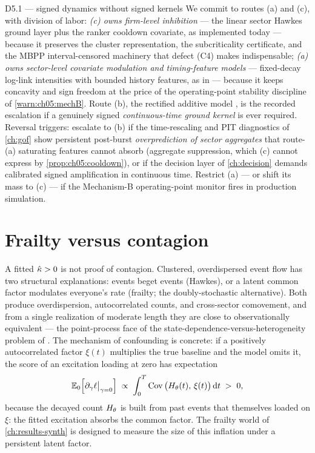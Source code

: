 \begin{decision}{D5.1 --- signed dynamics without signed kernels}
We commit to routes (a) and (c), with division of labor: \emph{(c) owns
firm-level inhibition} --- the linear sector Hawkes ground layer plus the
ranker cooldown covariate, as implemented today --- because it preserves
the cluster representation, the subcriticality certificate, and the MBPP
interval-censored machinery that defect (C4) makes indispensable;
\emph{(a) owns sector-level covariate modulation and timing-feature
models} --- fixed-decay log-link intensities with bounded history
features, as in  --- because it
keeps concavity and sign freedom at the price of the operating-point
stability discipline of \cref{warn:ch05:mechB}. Route (b), the rectified
additive model \citep{bonnet2021,costa2020}, is the recorded escalation
if a genuinely signed \emph{continuous-time ground kernel} is ever
required. Reversal triggers: escalate to (b) if the time-rescaling and
PIT diagnostics of \cref{ch:gof} show persistent post-burst
\emph{overprediction of sector aggregates} that route-(a) saturating
features cannot absorb (aggregate suppression, which (c) cannot express
by \cref{prop:ch05:cooldown}), or if the decision layer of
\cref{ch:decision} demands calibrated signed amplification in continuous
time. Restrict (a) --- or shift its mass to (c) --- if the Mechanism-B
operating-point monitor fires in production simulation.
\end{decision}

\section{Frailty versus contagion}\label{ch05:sec:frailty}

A fitted $\hat{\kappa} > 0$ is not proof of contagion. Clustered,
overdispersed event flow has two structural explanations: events beget
events (Hawkes), or a latent common factor modulates everyone's rate
(frailty; the doubly-stochastic alternative). Both produce
overdispersion, autocorrelated counts, and cross-sector comovement, and
from a single realization of moderate length they are close to
observationally equivalent --- the point-process face of the
state-dependence-versus-heterogeneity problem of
\citet{heckmanborjas1980}. The mechanism of confounding is concrete: if a
positively autocorrelated factor $\xi(t)$ multiplies the true baseline
and the model omits it, the score of an excitation loading at zero has
expectation
\begin{equation}\label{eq:ch05:frailtyscore}
\mathbb{E}_0\!\left[\partial_{\gamma}\ell \big|_{\gamma=0}\right]
\;\propto\;
\int_0^{T} \operatorname{Cov}\big(H_{\theta}(t),\, \xi(t)\big) \,\mathrm{d} t \;>\; 0,
\end{equation}
because the decayed count $H_\theta$ is built from past events that
themselves loaded on $\xi$: the fitted excitation absorbs the common
factor. The frailty world of \cref{ch:results-synth} is designed to
measure the size of this inflation under a persistent latent factor.

